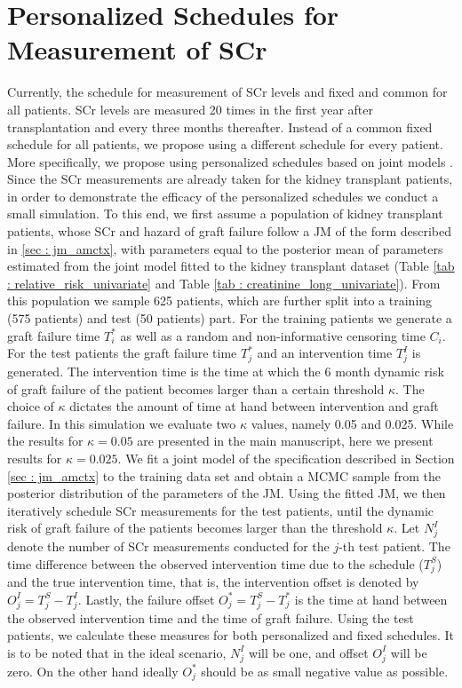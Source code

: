 \section{Personalized Schedules for Measurement of SCr}
\label{sec: simulation_study}
Currently, the schedule for measurement of SCr levels and fixed and common for all patients. SCr levels are measured 20 times in the first year after transplantation and every three months thereafter. Instead of a common fixed schedule for all patients, we propose using a different schedule for every patient. More specifically, we propose using personalized schedules based on joint models \citet{drizopoulosPersScreening}. Since the SCr measurements are already taken for the kidney transplant patients, in order to demonstrate the efficacy of the personalized schedules we conduct a small simulation. To this end, we first assume a population of kidney transplant patients, whose SCr and hazard of graft failure follow a JM of the form described in \ref{sec : jm_amctx}, with parameters equal to the posterior mean of parameters estimated from the joint model fitted to the kidney transplant dataset (Table \ref{tab : relative_risk_univariate} and Table \ref{tab : creatinine_long_univariate}). From this population we sample 625 patients, which are further split into a training (575 patients) and test (50 patients) part. For the training patients we generate a graft failure time $T^*_i$ as well as a random and non-informative censoring time $C_i$. For the test patients the graft failure time $T^*_j$ and an intervention time $T^I_j$ is generated. The intervention time is the time at which the 6 month dynamic risk of graft failure of the patient becomes larger than a certain threshold $\kappa$. The choice of $\kappa$ dictates the amount of time at hand between intervention and graft failure. In this simulation we evaluate two $\kappa$ values, namely 0.05 and 0.025. While the results for $\kappa = 0.05$ are presented in the main manuscript, here we present results for $\kappa = 0.025$. We fit a joint model of the specification described in Section \ref{sec : jm_amctx} to the training data set and obtain a MCMC sample from the posterior distribution of the parameters of the JM. Using the fitted JM, we then iteratively schedule SCr measurements for the test patients, until the dynamic risk of graft failure \citep{rizopoulos2011dynamic} of the patients becomes larger than the threshold $\kappa$. Let $N^I_j$ denote the number of SCr measurements conducted for the $j$-th test patient. The time difference between the observed intervention time due to the schedule ($T^S_j$) and the true intervention time, that is, the intervention offset is denoted by $O^I_j = T^S_j - T^I_j$. Lastly, the failure offset $O^*_j = T^S_j - T^*_j$ is the time at hand between the observed intervention time and the time of graft failure. Using the test patients, we calculate these measures for both personalized and fixed schedules. It is to be noted that in the ideal scenario, $N^I_j$ will be one, and offset $O^I_j$ will be zero. On the other hand ideally $O^*_j$ should be as small negative value as possible.

